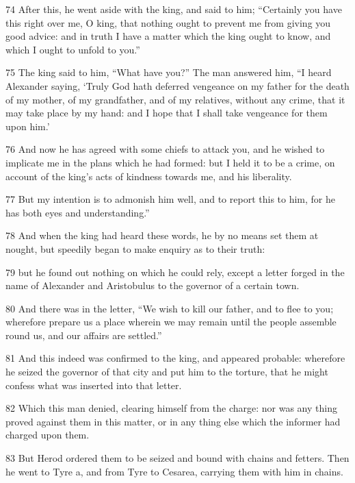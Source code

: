 \par 74 After this, he went aside with the king, and said to him; “Certainly you have this right over me, O king, that nothing ought to prevent me from giving you good advice: and in truth I have a matter which the king ought to know, and which I ought to unfold to you.” 

\par 75 The king said to him, “What have you?” The man answered him, “I heard Alexander saying, ‘Truly God hath deferred vengeance on my father for the death of my mother, of my grandfather, and of my relatives, without any crime, that it may take place by my hand: and I hope that I shall take vengeance for them upon him.’ 

\par 76 And now he has agreed with some chiefs to attack you, and he wished to implicate me in the plans which he had formed: but I held it to be a crime, on account of the king’s acts of kindness towards me, and his liberality. 

\par 77 But my intention is to admonish him well, and to report this to him, for he has both eyes and understanding.” 

\par 78 And when the king had heard these words, he by no means set them at nought, but speedily began to make enquiry as to their truth: 

\par 79 but he found out nothing on which he could rely, except a letter forged in the name of Alexander and Aristobulus to the governor of a certain town. 

\par 80 And there was in the letter, “We wish to kill our father, and to flee to you; wherefore prepare us a place wherein we may remain until the people  assemble round us, and our affairs are settled.” 

\par 81 And this indeed was confirmed to the king, and appeared probable: wherefore he seized the governor of that city and put him to the torture, that he might confess what was inserted into that letter. 

\par 82 Which this man denied, clearing himself from the charge: nor was any thing proved against them in this matter, or in any thing else which the informer had charged upon them. 

\par 83 But Herod ordered them to be seized and bound with chains and fetters. Then he went to Tyre a, and from Tyre to Cesarea, carrying them with him in chains. 


